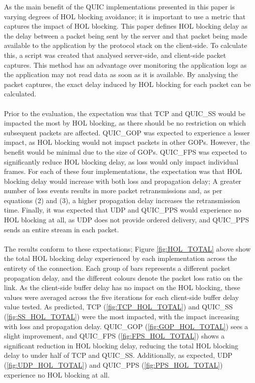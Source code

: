 \documentclass{mpaper}
\begin{document}
\noindent As the main benefit of the QUIC implementations presented in this paper is varying degrees of HOL blocking avoidance; it is important to use a metric that captures the impact of HOL blocking. This paper defines HOL blocking delay as the delay between a packet being sent by the server and that packet being made available to the application by the protocol stack on the client-side. To calculate this, a script was created that analysed server-side, and client-side packet captures. This method has an advantage over monitoring the application logs as the application may not read data as soon as it is available. By analysing the packet captures, the exact delay induced by HOL blocking for each packet can be calculated.
\\\\
Prior to the evaluation, the expectation was that TCP and \newline QUIC\_SS would be impacted the most by HOL blocking, as there should be no restriction on which subsequent packets are affected. QUIC\_GOP was expected to experience a lesser impact, as HOL blocking would not impact packets in other GOPs. However, the benefit would be minimal due to the size of GOPs. QUIC\_FPS was expected to significantly reduce HOL blocking delay, as loss would only impact individual frames. For each of these four implementations, the expectation was that HOL blocking delay would increase with both loss and propagation delay; A greater number of loss events results in more packet retransmissions and, as per equations (2) and (3), a higher propagation delay increases the retransmission time. Finally, it was expected that UDP and QUIC\_PPS would experience no HOL blocking at all, as UDP does not provide ordered delivery, and QUIC\_PPS sends an entire stream in each packet.
\\\\
The results conform to these expectations; Figure \ref{fig:HOL_TOTAL} above show the total HOL blocking delay experienced by each implementation across the entirety of the connection. Each group of bars represents a different packet propagation delay, and the different colours denote the packet loss ratio on the link. As the client-side buffer delay has no impact on the HOL blocking, these values were averaged across the five iterations for each client-side buffer delay value tested. As predicted, TCP (\ref{fig:TCP_HOL_TOTAL}) and QUIC\_SS (\ref{fig:SS_HOL_TOTAL}) were the most impacted, with the impact increasing with loss and propagation delay. QUIC\_GOP (\ref{fig:GOP_HOL_TOTAL}) sees a slight improvement, and QUIC\_FPS (\ref{fig:FPS_HOL_TOTAL}) shows a significant reduction in HOL blocking delay, reducing the total HOL blocking delay to under half of TCP and QUIC\_SS. Additionally, as expected, UDP (\ref{fig:UDP_HOL_TOTAL}) and QUIC\_PPS (\ref{fig:PPS_HOL_TOTAL}) experience no HOL blocking at all.
\end{document}
